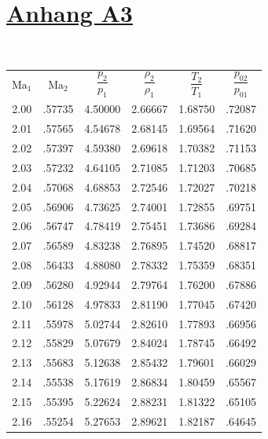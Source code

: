 \section*{\underline{Anhang A3}}
\\ \vspace{4mm}%
\begin{minipage}{0.47\textwidth}
    \centering
    \begin{tabular}{c|c|c|c|c|c}
        $\text{Ma}_1$ & $\text{Ma}_2$ & $\dfrac{p_2}{p_1}$ & $\dfrac{\rho_2}{\rho_1}$ & $\dfrac{T_2}{T_1}$ & $\dfrac{p_{02}}{p_{01}}$ \\[2.2ex] \arrayrulecolor{Blue}\hline\arrayrulecolor{black}
        2.00 & .57735 & 4.50000 & 2.66667 & 1.68750 & .72087 \\
        2.01 & .57565 & 4.54678 & 2.68145 & 1.69564 & .71620 \\ \arrayrulecolor{Red}\hline\arrayrulecolor{black}
        2.02 & .57397 & 4.59380 & 2.69618 & 1.70382 & .71153 \\
        2.03 & .57232 & 4.64105 & 2.71085 & 1.71203 & .70685 \\
        2.04 & .57068 & 4.68853 & 2.72546 & 1.72027 & .70218 \\
        2.05 & .56906 & 4.73625 & 2.74001 & 1.72855 & .69751 \\
        2.06 & .56747 & 4.78419 & 2.75451 & 1.73686 & .69284 \\
        2.07 & .56589 & 4.83238 & 2.76895 & 1.74520 & .68817 \\
        2.08 & .56433 & 4.88080 & 2.78332 & 1.75359 & .68351 \\
        2.09 & .56280 & 4.92944 & 2.79764 & 1.76200 & .67886 \\
        2.10 & .56128 & 4.97833 & 2.81190 & 1.77045 & .67420 \\
        2.11 & .55978 & 5.02744 & 2.82610 & 1.77893 & .66956 \\
        2.12 & .55829 & 5.07679 & 2.84024 & 1.78745 & .66492 \\
        2.13 & .55683 & 5.12638 & 2.85432 & 1.79601 & .66029 \\
        2.14 & .55538 & 5.17619 & 2.86834 & 1.80459 & .65567 \\
        2.15 & .55395 & 5.22624 & 2.88231 & 1.81322 & .65105 \\
        2.16 & .55254 & 5.27653 & 2.89621 & 1.82187 & .64645 \\

\end{tabular}
\end{minipage}
